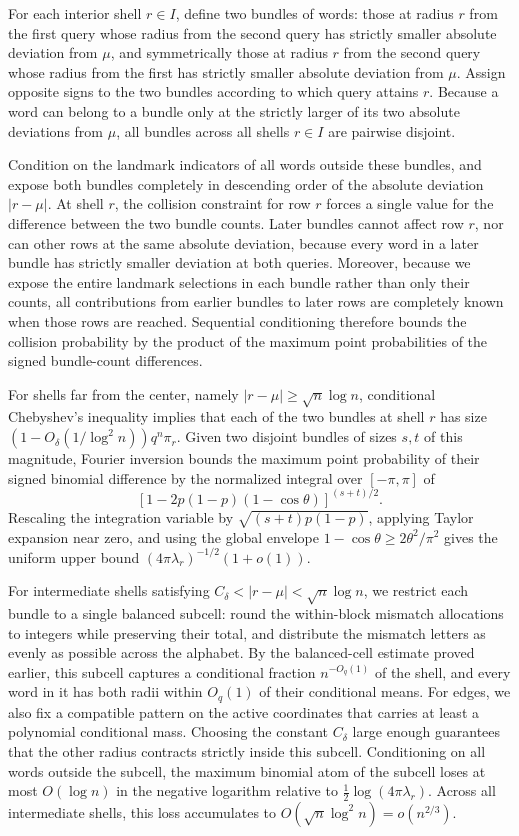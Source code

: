 For each interior shell $r\in I$, define two bundles of words: those at radius $r$ from the first query whose radius from the second query has strictly smaller absolute deviation from $\mu$, and symmetrically those at radius $r$ from the second query whose radius from the first has strictly smaller absolute deviation from $\mu$. Assign opposite signs to the two bundles according to which query attains $r$. Because a word can belong to a bundle only at the strictly larger of its two absolute deviations from $\mu$, all bundles across all shells $r\in I$ are pairwise disjoint.

Condition on the landmark indicators of all words outside these bundles, and expose both bundles completely in descending order of the absolute deviation $|r-\mu|$. At shell $r$, the collision constraint for row $r$ forces a single value for the difference between the two bundle counts. Later bundles cannot affect row $r$, nor can other rows at the same absolute deviation, because every word in a later bundle has strictly smaller deviation at both queries. Moreover, because we expose the entire landmark selections in each bundle rather than only their counts, all contributions from earlier bundles to later rows are completely known when those rows are reached. Sequential conditioning therefore bounds the collision probability by the product of the maximum point probabilities of the signed bundle-count differences.

For shells far from the center, namely $|r-\mu|\ge\sqrt n\log n$, conditional Chebyshev's inequality implies that each of the two bundles at shell $r$ has size $(1-O_\delta(1/\log^2 n))q^n\pi_r$. Given two disjoint bundles of sizes $s,t$ of this magnitude, Fourier inversion bounds the maximum point probability of their signed binomial difference by the normalized integral over $[-\pi,\pi]$ of
\[
 [1-2p(1-p)(1-\cos\theta)]^{(s+t)/2}.
\]
Rescaling the integration variable by $\sqrt{(s+t)p(1-p)}$, applying Taylor expansion near zero, and using the global envelope $1-\cos\theta\ge2\theta^2/\pi^2$ gives the uniform upper bound $(4\pi\lambda_r)^{-1/2}(1+o(1))$.

For intermediate shells satisfying $C_\delta<|r-\mu|<\sqrt n\log n$, we restrict each bundle to a single balanced subcell: round the within-block mismatch allocations to integers while preserving their total, and distribute the mismatch letters as evenly as possible across the alphabet. By the balanced-cell estimate proved earlier, this subcell captures a conditional fraction $n^{-O_q(1)}$ of the shell, and every word in it has both radii within $O_q(1)$ of their conditional means. For edges, we also fix a compatible pattern on the active coordinates that carries at least a polynomial conditional mass. Choosing the constant $C_\delta$ large enough guarantees that the other radius contracts strictly inside this subcell. Conditioning on all words outside the subcell, the maximum binomial atom of the subcell loses at most $O(\log n)$ in the negative logarithm relative to $\frac12\log(4\pi\lambda_r)$. Across all intermediate shells, this loss accumulates to $O(\sqrt n\log^2 n)=o(n^{2/3})$.

